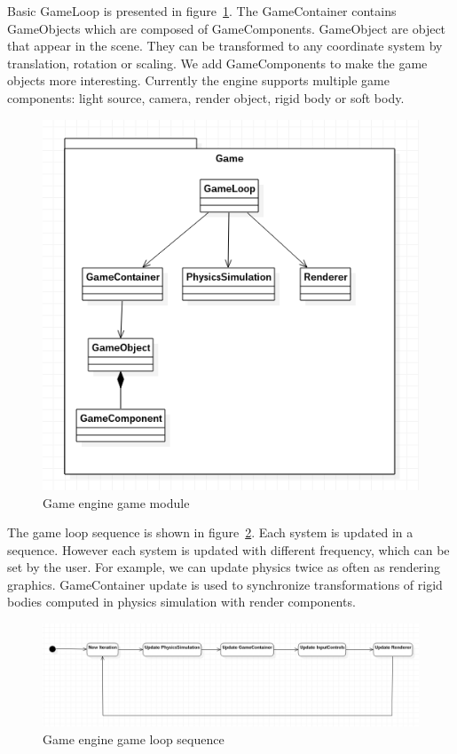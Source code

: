 \documentclass[en]{minipw} %
\begin{document}
Basic GameLoop is presented in figure~\ref{fig:ifx_game1}. The GameContainer contains GameObjects which are composed of GameComponents. GameObject are object that appear in the scene. They can be transformed to any coordinate system by translation, rotation or scaling. We add GameComponents to make the game objects more interesting. Currently the engine supports multiple game components: light source, camera, render object, rigid body or soft body.

\begin{figure}[h!]
\centering
\includegraphics[scale=0.5]{pictures/ifx_game.png}
\caption[Game engine game module]{Game engine game module}
\label{fig:ifx_game1}
\end{figure}

The game loop sequence is shown in figure~\ref{fig:ifx_game_loop}. Each system is updated in a sequence. However each system is updated with different frequency, which can be set by the user. For example, we can update physics twice as often as rendering graphics. GameContainer update is used to synchronize transformations of rigid bodies computed in physics simulation with render components.

\begin{figure}[h!]
\centering
\includegraphics[scale=0.4]{pictures/game_loop.png}
\caption[Game engine game loop sequence]{Game engine game loop sequence}
\label{fig:ifx_game_loop}
\end{figure}
\end{document}
